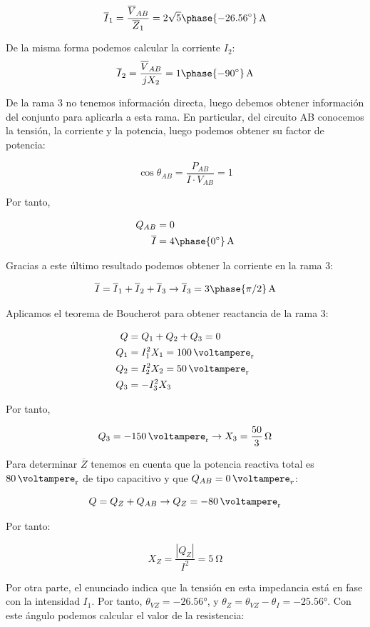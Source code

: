 \documentclass[12pt]{article}
\begin{document}
\[
  \overline{I}_1 = \frac{\overline{V}_{AB}}{\overline{Z}_1} = \SI[parse-numbers=false]{2\sqrt{5}\phase{\ang{-26.56}}}{\ampere} 
\]

De la misma forma podemos calcular la corriente $I_2$:
\[
  \overline{I}_2 = \frac{\overline{V}_{AB}}{jX_2} = \SI[parse-numbers=false]{1\phase{\ang{-90}}}{\ampere} 
\]

De la rama 3 no tenemos información directa, luego debemos obtener información del conjunto para aplicarla a esta rama. En particular, del circuito AB conocemos la tensión, la corriente y la potencia, luego podemos obtener su factor de potencia:

\[
  \cos\theta_{AB} = \frac{P_{AB}}{I \cdot V_{AB}} = 1
\]

Por tanto,

\begin{align*}
  Q_{AB} &= 0\\
  \overline{I} &= \SI[parse-numbers=false]{4\phase{\ang{0}}}{\ampere} 
\end{align*}
  
Gracias a este último resultado podemos obtener la corriente en la rama 3:

\[
  \overline{I} = \overline{I}_1 + \overline{I}_2 + \overline{I}_3 \rightarrow \overline{I}_3 = \SI[parse-numbers=false]{3\phase{\pi/2}}{\ampere}
\]

Aplicamos el teorema de Boucherot para obtener reactancia de la rama 3:

\begin{align*}
  Q &= Q_1 + Q_2 + Q_3 = 0\\
  Q_1 &= I_1^2 X_1 = \SI{100}{\voltampere_r}\\
  Q_2 &= I_2^2 X_2 = \SI{50}{\voltampere_r}\\
  Q_3 &= - I_3^2 X_3
\end{align*}

Por tanto,

\[
   Q_3 = -\SI{150}{\voltampere_r} \rightarrow X_3 = \SI[parse-numbers=false]{\frac{50}{3}}{\ohm}
\]

Para determinar $\overline{Z}$ tenemos en cuenta que la potencia reactiva total es $\SI{80}{\voltampere_r}$ de tipo capacitivo y que $Q_{AB} = \SI{0}{\voltampere}_r$:

\[
  Q = Q_Z + Q_{AB} \rightarrow Q_Z = -\SI{80}{\voltampere_r} 
\]

Por tanto:

\[
  X_Z = \frac{|Q_Z|}{I^2} = \SI{5}{\ohm}
\]

Por otra parte, el enunciado indica que la tensión en esta impedancia está en fase con la intensidad $I_1$. Por tanto, $\theta_{VZ} = \ang{-26.56}$, y $\theta_Z = \theta_{VZ} - \theta_{I} = \ang{-25.56}$. Con este ángulo podemos calcular el valor de la resistencia:
\end{document}
